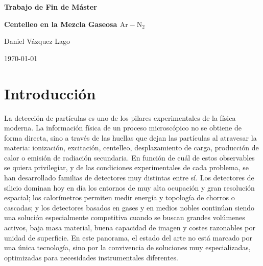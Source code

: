 \documentclass[12pt,a4paper]{article}
\newcommand{\N}{\mathrm{N}}
\newcommand{\Ar}{\mathrm{Ar}}
\begin{document}

\thispagestyle{empty}
\begin{titlepage}
    \centering
    \vspace*{0.20\textheight}

    {\Huge\bfseries Trabajo de Fin de Máster\par}
    \vspace{2.2em}

    {\LARGE\bfseries Centelleo en la Mezcla Gaseosa $\Ar-\N_2$\par}
    \vspace{5em}

    {\Large Daniel Vázquez Lago\par}
    \vspace{2.2em}

    {\Large \today\par}
\end{titlepage}

\pagestyle{empty}
\tableofcontents
\clearpage

\setlength{\parindent}{0pt}
\setlength{\parskip}{0.45em}

\pagestyle{fancy}

\section{Introducción}

La detección de partículas es uno de los pilares experimentales de la física moderna. La información física de un proceso microscópico no se obtiene de forma directa, sino a través de las huellas que dejan las partículas al atravesar la materia: ionización, excitación, centelleo, desplazamiento de carga, producción de calor o emisión de radiación secundaria. En función de cuál de estos observables se quiera privilegiar, y de las condiciones experimentales de cada problema, se han desarrollado familias de detectores muy distintas entre sí. Los detectores de silicio dominan hoy en día los entornos de muy alta ocupación y gran resolución espacial; los calorímetros permiten medir energía y topología de chorros o cascadas; y los detectores basados en gases y en medios nobles continúan siendo una solución especialmente competitiva cuando se buscan grandes volúmenes activos, baja masa material, buena capacidad de imagen y costes razonables por unidad de superficie. En este panorama, el estado del arte no está marcado por una única tecnología, sino por la convivencia de soluciones muy especializadas, optimizadas para necesidades instrumentales diferentes.
\end{document}

